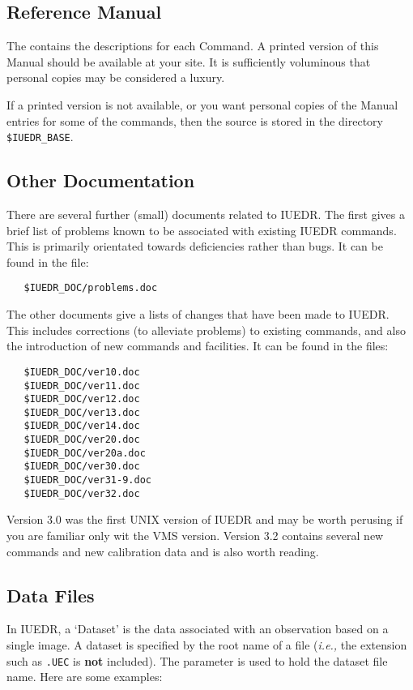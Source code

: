 \subsection{Reference Manual}

The  contains the descriptions for
each Command.
A printed version of this Manual should be available at your site.  It is
sufficiently voluminous that personal copies may be considered a luxury.

If a printed version is not available, or you want personal copies of the
Manual entries for some of the commands, then the source is stored in the
directory \verb+$IUEDR_BASE+.


\subsection{Other Documentation}

There are several further (small) documents related to IUEDR\@.
The first gives a brief list of problems known to be associated with existing
IUEDR commands.
This is primarily orientated towards deficiencies rather than bugs.
It can be found in the file:

\begin{verbatim}
   $IUEDR_DOC/problems.doc
\end{verbatim}

The other documents give a lists of changes that have been made to IUEDR\@.
This includes corrections (to alleviate problems) to existing commands, and
also the introduction of new commands and facilities.
It can be found in the files:

\begin{verbatim}
   $IUEDR_DOC/ver10.doc
   $IUEDR_DOC/ver11.doc
   $IUEDR_DOC/ver12.doc
   $IUEDR_DOC/ver13.doc
   $IUEDR_DOC/ver14.doc
   $IUEDR_DOC/ver20.doc
   $IUEDR_DOC/ver20a.doc
   $IUEDR_DOC/ver30.doc
   $IUEDR_DOC/ver31-9.doc
   $IUEDR_DOC/ver32.doc
\end{verbatim}

Version 3.0 was the first UNIX version of IUEDR and may be worth perusing if
you are familiar only wit the VMS version.  Version 3.2 contains several new
commands and new calibration data and is also worth reading.


\subsection{Data Files}

In IUEDR, a `Dataset' is the data associated with an observation based on a
single image.  A dataset is specified by the root name of a file ({\it{i.e.,}}
the extension such as \verb+.UEC+ is {\bf not} included)\@.  The
parameter is used to hold the dataset file name.  Here are some examples:

